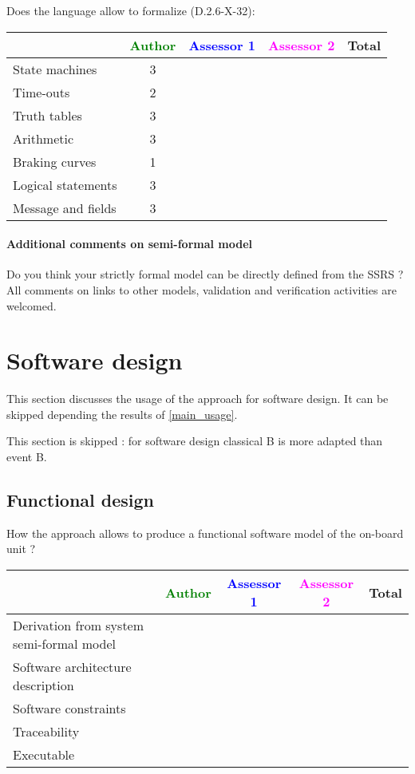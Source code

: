 Does the language allow to  formalize (D.2.6-X-32):

\begin{tabular}{|l | c | c | c | c|}
\hline
& \textcolor{green}{Author} & \textcolor{blue}{Assessor 1} & \textcolor{magenta}{Assessor 2} & Total \\
\hline 
State machines  & 3 & & &  \\
\hline
Time-outs  & 2 & & &  \\
\hline
Truth tables  & 3 & & &  \\
\hline
Arithmetic  & 3 & & &  \\
\hline
Braking curves  & 1 & & &  \\
\hline
Logical statements & 3 & & &  \\
\hline
Message and fields & 3 & & &  \\
\hline
\end{tabular}

\paragraph{Additional comments on semi-formal  model} Do you think your strictly formal  model can be directly defined from the SSRS ?
All comments on links to  other models, validation and verification activities are welcomed.


\section{Software design}
This section discusses the usage of the approach for software design.
It can be skipped depending the results of \ref{main_usage}.

\begin{author}
This section is skipped :  for software design classical B is more adapted than event B.
\end{author}


\subsection{Functional design}


How the approach allows to  produce a functional software model of the on-board unit ?

\begin{tabular}{|l | c | c | c | c|}
\hline
& \textcolor{green}{Author} & \textcolor{blue}{Assessor 1} & \textcolor{magenta}{Assessor 2} & Total \\
\hline
Derivation from system semi-formal model  & & & &  \\
\hline 
Software architecture description  & & & &  \\
\hline
Software constraints  & & & &  \\
\hline
Traceability  & & & &  \\
\hline
Executable  & & & &  \\
\hline
\end{tabular}

